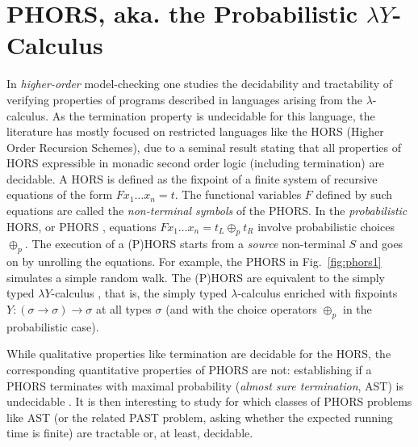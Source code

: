 \documentclass{easychair}
\begin{document}
\section{PHORS, aka. the Probabilistic $\lambda Y$-Calculus}

In \emph{higher-order} model-checking one studies the decidability and tractability of verifying properties of programs described in languages arising from the $\lambda$-calculus.
As the termination property is undecidable for this language, the literature has mostly focused on restricted languages like the HORS (Higher Order Recursion Schemes), due to a seminal result \cite{10.1109/LICS.2006.38} stating that all properties of HORS expressible in monadic second order logic (including termination) are decidable.  
A HORS is defined as the fixpoint of a finite system of recursive equations of the form $Fx_1\dots x_n=t$. 
The functional variables $F$ defined by such equations are called the \emph{non-terminal symbols} of the PHORS. 
In the \emph{probabilistic} HORS, or PHORS \cite{DBLP:journals/lmcs/KobayashiLG20}, equations $Fx_1\dots x_n=t_L\oplus_p t_R$ involve probabilistic choices $\oplus_p$.
The execution of a (P)HORS starts from a \emph{source} non-terminal $S$ and goes on by unrolling the equations. 
For example, the PHORS in Fig.~\ref{fig:phors1} simulates a simple random walk.
The (P)HORS are equivalent to the simply typed $\lambda Y$-calculus \cite{10.5555/645683.664581}, that is, the simply typed $\lambda$-calculus enriched with fixpoints $Y:(\sigma\to\sigma)\to\sigma$ at all types $\sigma$ (and with the choice operators $\oplus_p$ in the probabilistic case).
%
%

While qualitative properties like termination are decidable for the HORS, the corresponding quantitative properties of PHORS are not: establishing if a PHORS terminates with maximal probability (\emph{almost sure termination}, AST) is undecidable \cite{DBLP:journals/lmcs/KobayashiLG20}. It is then interesting to study for which classes of PHORS problems like AST (or the related PAST problem, asking whether the expected running time is finite) are tractable or, at least, decidable.
\end{document}
